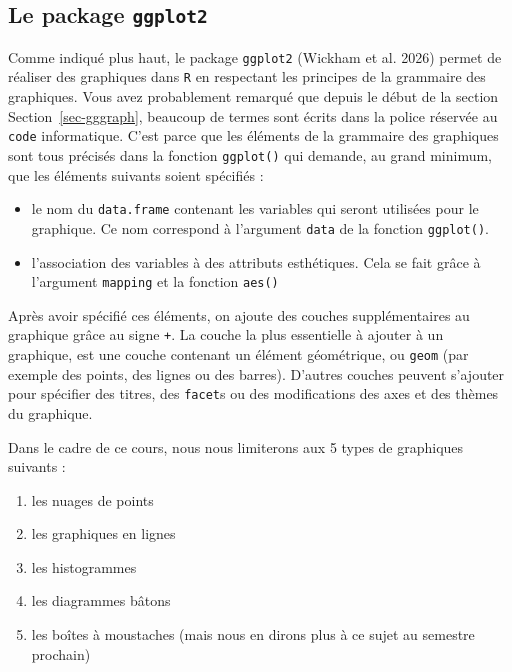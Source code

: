 \documentclass[
  a4paper,
  DIV=11,
  numbers=noendperiod,
  oneside]{scrreprt}
\providecommand{\tightlist}{%
  \setlength{\itemsep}{0pt}\setlength{\parskip}{0pt}}\usepackage{longtable,booktabs,array}
\begin{document}
\subsection{\texorpdfstring{Le package
\texttt{ggplot2}}{Le package ggplot2}}\label{le-package-ggplot2}

Comme indiqué plus haut, le package \texttt{ggplot2} (Wickham et al.
2026) permet de réaliser des graphiques dans \texttt{R} en respectant
les principes de la grammaire des graphiques. Vous avez probablement
remarqué que depuis le début de la section Section~\ref{sec-gggraph},
beaucoup de termes sont écrits dans la police réservée au \texttt{code}
informatique. C'est parce que les éléments de la grammaire des
graphiques sont tous précisés dans la fonction \texttt{ggplot()} qui
demande, au grand minimum, que les éléments suivants soient spécifiés :

\begin{itemize}
\tightlist
\item
  le nom du \texttt{data.frame} contenant les variables qui seront
  utilisées pour le graphique. Ce nom correspond à l'argument
  \texttt{data} de la fonction \texttt{ggplot()}.
\item
  l'association des variables à des attributs esthétiques. Cela se fait
  grâce à l'argument \texttt{mapping} et la fonction \texttt{aes()}
\end{itemize}

Après avoir spécifié ces éléments, on ajoute des couches supplémentaires
au graphique grâce au signe \texttt{+}. La couche la plus essentielle à
ajouter à un graphique, est une couche contenant un élément géométrique,
ou \texttt{geom} (par exemple des points, des lignes ou des barres).
D'autres couches peuvent s'ajouter pour spécifier des titres, des
\texttt{facet}s ou des modifications des axes et des thèmes du
graphique.

Dans le cadre de ce cours, nous nous limiterons aux 5 types de
graphiques suivants :

\begin{enumerate}
\def\labelenumi{\arabic{enumi}.}
\tightlist
\item
  les nuages de points
\item
  les graphiques en lignes
\item
  les histogrammes
\item
  les diagrammes bâtons
\item
  les boîtes à moustaches (mais nous en dirons plus à ce sujet au
  semestre prochain)
\end{enumerate}
\end{document}
